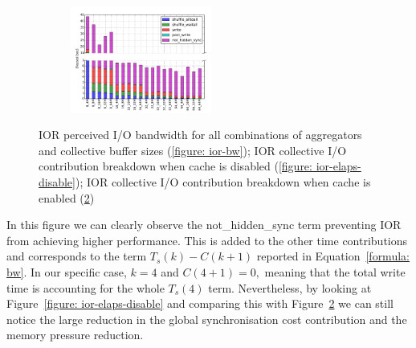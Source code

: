 \begin{figure}[!htb]
\begin{subfigure}[b]{\textwidth}
  \centering
  \includegraphics[width=0.51\textwidth]{chapters/chapter3/figures/ior_32GB_30sec_enable}
  \caption{}
  \label{figure: ior-elaps-enable}
  \end{subfigure}
  \caption{IOR perceived I/O bandwidth for all combinations of aggregators and collective buffer sizes (\ref{figure: ior-bw}); IOR collective I/O contribution breakdown when cache is disabled (\ref{figure: ior-elaps-disable}); IOR collective I/O contribution 
  breakdown when cache is enabled (\ref{figure: ior-elaps-enable})}
\end{figure}
In this figure we can clearly observe the not\_hidden\_sync term preventing IOR from achieving higher performance. This is added to the other time contributions and corresponds to the term $T_s(k)-C(k+1)$ reported in Equation~\ref{formula: bw}. In our specific 
case, $k = 4$ and $C(4+1) = 0,$ meaning that the total write time is accounting for the whole $T_s(4)$ term. Nevertheless, by looking at Figure~\ref{figure: ior-elaps-disable} and comparing this with Figure~\ref{figure: ior-elaps-enable} we can still notice the 
large reduction in the global synchronisation cost contribution and the memory pressure reduction.

